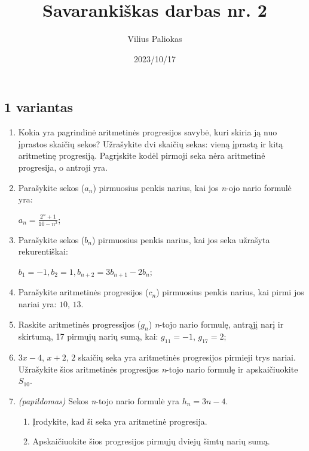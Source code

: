 \documentclass[a4paper]{article}
\title{Savarankiškas darbas nr. 2}
\author{Vilius Paliokas}
\date{2023/10/17}
\begin{document}
\thispagestyle{fancy}

\subsection*{1 variantas}

\begin{enumerate}
      \item Kokia yra pagrindinė aritmetinės progresijos savybė, kuri skiria ją
            nuo įprastos skaičių sekos? Užrašykite dvi skaičių sekas: vieną
            įprastą ir kitą aritmetinę progresiją. Pagrįskite kodėl pirmoji
            seka nėra
            aritmetinė progresija, o antroji yra.

      \item Parašykite sekos ($a_{n}$) pirmuosius penkis
            narius, kai jos \textit{n}-ojo nario formulė yra:

            $a_{n}=\frac{2^{n} + 1}{10 - n^2}$;

      \item Parašykite sekos ($b_{n}$) pirmuosius penkis
            narius, kai jos seka užrašyta rekurentiškai:

            $b_1 = -1, b_{2} = 1, b_{n+2}=3b_{n+1}-2b_{n}$;

      \item Parašykite aritmetinės progresijos ($c_{n}$) pirmuosius penkis
            narius, kai pirmi jos nariai yra: $10$, $13$.

      \item Raskite aritmetinės progressijos ($g_{n}$) \textit{n}-tojo nario
            formulę, antrąjį narį ir
            skirtumą, 17 pirmųjų narių sumą, kai:
            $g_{11} = -1$, $g_{17}=2$;
      \item $ 3x -4 $, $x + 2$, $2$ skaičių seka yra aritmetinės progresijos
            pirmieji trys nariai. Užrašykite šios aritmetinės progresijos
            \textit{n}-tojo
            nario formulę ir apskaičiuokite $S_{10}$.

      \item \textit{(papildomas)} Sekos \textit{n}-tojo nario formulė yra $h_{n} = 3n-4$. 
      \begin{enumerate}[label= (\alph*)]
            \item Įrodykite, kad ši seka yra aritmetinė progresija.
            \item Apskaičiuokite šios progresijos pirmųjų dviejų šimtų narių sumą.
      \end{enumerate} 
\end{enumerate}
\end{document}
